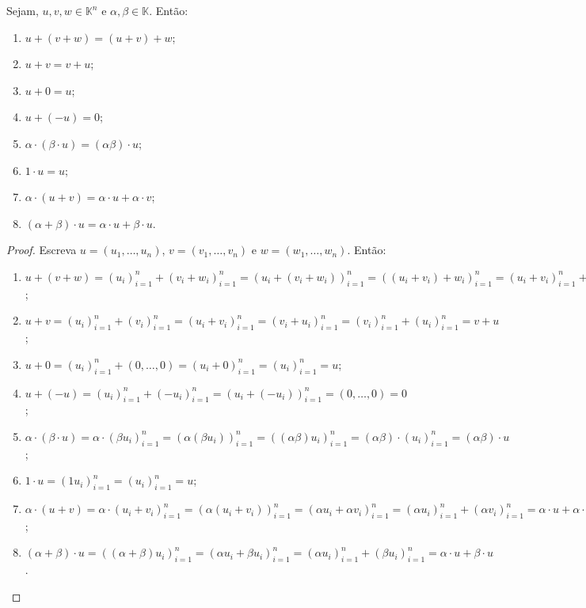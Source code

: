 \begin{proposition}\label{prop:propriedadesKn}
    Sejam, $u, v, w \in \mathbb K^n$ e $\alpha, \beta \in \mathbb K$. Então:
    \begin{enumerate}[label=(\roman*)]
        \item $u + (v + w) = (u + v) + w$;
        \item $u + v = v + u$;
        \item $u + 0 = u$;
        \item $u + (-u) = 0$;
        \item $\alpha \cdot (\beta \cdot u) = (\alpha \beta) \cdot u$;
        \item $1 \cdot u = u$;
        \item $\alpha \cdot (u + v) = \alpha \cdot u + \alpha \cdot v$;
        \item $(\alpha + \beta) \cdot u = \alpha \cdot u + \beta \cdot u$.
    \end{enumerate}
\end{proposition}
\begin{proof}
    Escreva $u=(u_1, \dots, u_n)$, $v=(v_1, \dots, v_n)$ e $w=(w_1, \dots, w_n)$.
    Então:
    \begin{enumerate}[label=(\roman*)]
        \item $u + (v + w) = (u_i)_{i=1}^n + (v_i + w_i)_{i=1}^n = (u_i + (v_i + w_i))_{i=1}^n = ((u_i + v_i) + w_i)_{i=1}^n = (u_i + v_i)_{i=1}^n + (w_i)_{i=1}^n = (u + v) + w$;
        \item $u + v = (u_i)_{i=1}^n + (v_i)_{i=1}^n = (u_i + v_i)_{i=1}^n = (v_i + u_i)_{i=1}^n = (v_i)_{i=1}^n + (u_i)_{i=1}^n = v + u$;
        \item $u + 0 = (u_i)_{i=1}^n + (0, \dots, 0) = (u_i + 0)_{i=1}^n = (u_i)_{i=1}^n = u$;
        \item $u + (-u) = (u_i)_{i=1}^n + (-u_i)_{i=1}^n = (u_i + (-u_i))_{i=1}^n = (0, \dots, 0) = 0$;
        \item $\alpha \cdot (\beta \cdot u) = \alpha \cdot (\beta u_i)_{i=1}^n = (\alpha (\beta u_i))_{i=1}^n = ((\alpha \beta) u_i)_{i=1}^n = (\alpha \beta) \cdot (u_i)_{i=1}^n = (\alpha \beta) \cdot u$;
        \item $1 \cdot u = (1 u_i)_{i=1}^n = (u_i)_{i=1}^n = u$;
        \item $\alpha \cdot (u + v) = \alpha \cdot (u_i + v_i)_{i=1}^n = (\alpha (u_i + v_i))_{i=1}^n = (\alpha u_i + \alpha v_i)_{i=1}^n = (\alpha u_i)_{i=1}^n + (\alpha v_i)_{i=1}^n = \alpha \cdot u + \alpha \cdot v$;
        \item $(\alpha + \beta) \cdot u = ((\alpha + \beta) u_i)_{i=1}^n = (\alpha u_i + \beta u_i)_{i=1}^n = (\alpha u_i)_{i=1}^n + (\beta u_i)_{i=1}^n = \alpha \cdot u + \beta \cdot u$.
    \end{enumerate}
\end{proof}

